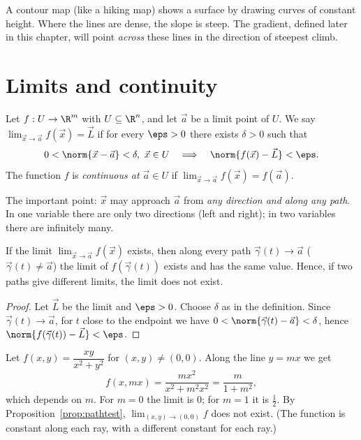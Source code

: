 \begin{intuition}
A contour map (like a hiking map) shows a surface by drawing curves of constant height. Where the lines are dense, the slope is steep. The gradient, defined later in this chapter, will point \emph{across} these lines in the direction of steepest climb.
\end{intuition}

\section{Limits and continuity}

\begin{definition}
Let $f:U\to\R^m$ with $U\subseteq\R^n$, and let $\vec a$ be a limit point of $U$. We say $\lim_{\vec x\to\vec a}f(\vec x)=\vec L$ if for every $\eps>0$ there exists $\delta>0$ such that
\[
0<\norm{\vec x-\vec a}<\delta,\ \vec x\in U\quad\Longrightarrow\quad\norm{f(\vec x)-\vec L}<\eps .
\]
The function $f$ is \emph{continuous at $\vec a\in U$} if $\lim_{\vec x\to\vec a}f(\vec x)=f(\vec a)$.
\end{definition}

The important point: $\vec x$ may approach $\vec a$ from \emph{any direction and along any path}. In one variable there are only two directions (left and right); in two variables there are infinitely many.

\begin{proposition}\label{prop:pathtest}
If the limit $\lim_{\vec x\to\vec a}f(\vec x)$ exists, then along every path $\vec\gamma(t)\to\vec a$ ($\vec\gamma(t)\ne\vec a$) the limit of $f(\vec\gamma(t))$ exists and has the same value. Hence, if two paths give different limits, the limit does not exist.
\end{proposition}

\begin{proof}
Let $\vec L$ be the limit and $\eps>0$. Choose $\delta$ as in the definition. Since $\vec\gamma(t)\to\vec a$, for $t$ close to the endpoint we have $0<\norm{\vec\gamma(t)-\vec a}<\delta$, hence $\norm{f(\vec\gamma(t))-\vec L}<\eps$.
\end{proof}

\begin{example}
Let $f(x,y)=\dfrac{xy}{x^2+y^2}$ for $(x,y)\ne(0,0)$. Along the line $y=mx$ we get
\[
f(x,mx)=\frac{mx^2}{x^2+m^2x^2}=\frac{m}{1+m^2},
\]
which depends on $m$. For $m=0$ the limit is $0$; for $m=1$ it is $\tfrac12$. By Proposition~\ref{prop:pathtest}, $\lim_{(x,y)\to(0,0)}f$ does not exist. (The function is constant along each ray, with a different constant for each ray.)
\end{example}

